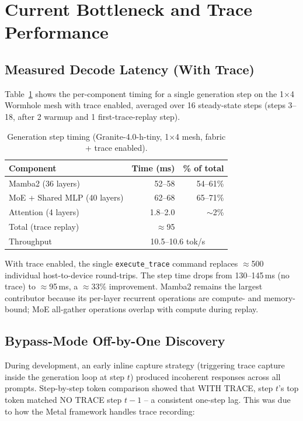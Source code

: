 \section{Current Bottleneck and Trace Performance}
\label{sec:bottleneck}

\subsection{Measured Decode Latency (With Trace)}

Table~\ref{tab:timing} shows the per-component timing for a single generation step on the 1$\times$4 Wormhole mesh with trace enabled, averaged over 16 steady-state steps (steps 3--18, after 2 warmup and 1 first-trace-replay step).

\begin{table}[h]
\caption{Generation step timing (Granite-4.0-h-tiny, 1$\times$4 mesh, fabric + trace enabled).}
\label{tab:timing}
\begin{tabular}{lrr}
\toprule
Component & Time (ms) & \% of total \\
\midrule
Mamba2 (36 layers) & 52--58 & 54--61\% \\
MoE + Shared MLP (40 layers) & 62--68 & 65--71\% \\
Attention (4 layers) & 1.8--2.0 & $\sim$2\% \\
\midrule
Total (trace replay) & $\approx$95 & \\
Throughput & \multicolumn{2}{c}{10.5--10.6 tok/s} \\
\bottomrule
\end{tabular}
\end{table}

With trace enabled, the single \texttt{execute\_trace} command replaces $\approx$500 individual host-to-device round-trips. The step time drops from 130--145\,ms (no trace) to $\approx$95\,ms, a $\approx$33\% improvement. Mamba2 remains the largest contributor because its per-layer recurrent operations are compute- and memory-bound; MoE all-gather operations overlap with compute during replay.

\subsection{Bypass-Mode Off-by-One Discovery}

During development, an early inline capture strategy (triggering trace capture inside the generation loop at step $t$) produced incoherent responses across all prompts. Step-by-step token comparison showed that WITH TRACE, step $t$'s top token matched NO TRACE step $t-1$ -- a consistent one-step lag. This was due to how the Metal framework handles trace recording:

